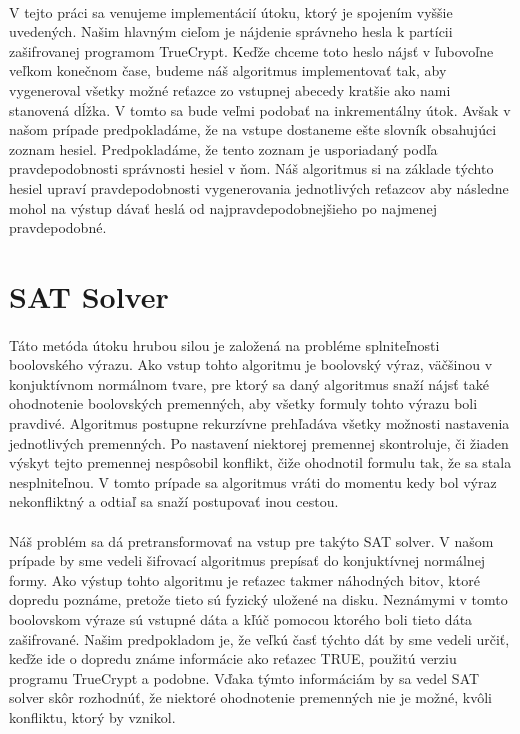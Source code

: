 \paragraph{}
V tejto práci sa venujeme implementácií útoku, ktorý je spojením vyššie uvedených. Našim hlavným cieľom je nájdenie správneho hesla k partícii zašifrovanej programom TrueCrypt. Keďže chceme toto heslo nájsť v ľubovoľne veľkom konečnom čase, budeme náš algoritmus implementovať tak, aby vygeneroval všetky možné reťazce zo vstupnej abecedy kratšie ako nami stanovená dĺžka. V tomto sa bude veľmi podobať na inkrementálny útok. Avšak v našom prípade predpokladáme, že na vstupe dostaneme ešte slovník obsahujúci zoznam hesiel. Predpokladáme, že tento zoznam je usporiadaný podľa pravdepodobnosti správnosti hesiel v ňom. Náš algoritmus si na základe týchto hesiel upraví pravdepodobnosti vygenerovania jednotlivých reťazcov aby následne mohol na výstup dávať heslá od najpravdepodobnejšieho po najmenej pravdepodobné. 

\section{SAT Solver}
\paragraph{}
Táto metóda útoku hrubou silou je založená na probléme splniteľnosti boolovského výrazu. Ako vstup tohto algoritmu je boolovský výraz, väčšinou v konjuktívnom normálnom tvare, pre ktorý sa daný algoritmus snaží nájsť také ohodnotenie boolovských premenných, aby všetky formuly tohto výrazu boli pravdivé. Algoritmus postupne rekurzívne prehľadáva všetky možnosti nastavenia jednotlivých premenných. Po nastavení niektorej premennej skontroluje, či žiaden výskyt tejto premennej nespôsobil konflikt, čiže ohodnotil formulu tak, že sa stala nesplniteľnou. V tomto prípade sa algoritmus vráti do momentu kedy bol výraz nekonfliktný a odtiaľ sa snaží postupovať inou cestou.

\paragraph{}
Náš problém sa dá pretransformovať na vstup pre takýto SAT solver. V našom prípade by sme vedeli šifrovací algoritmus prepísať do konjuktívnej normálnej formy. Ako výstup tohto algoritmu je reťazec takmer náhodných bitov, ktoré dopredu poznáme, pretože tieto sú fyzický uložené na disku. Neznámymi v tomto boolovskom výraze sú vstupné dáta a kľúč pomocou ktorého boli tieto dáta zašifrované. Našim predpokladom je, že veľkú časť týchto dát by sme vedeli určiť, keďže ide o dopredu známe informácie ako reťazec TRUE, použitú verziu programu TrueCrypt a podobne. Vďaka týmto informáciám by sa vedel SAT solver skôr rozhodnúť, že niektoré ohodnotenie premenných nie je možné, kvôli konfliktu, ktorý by vznikol.

